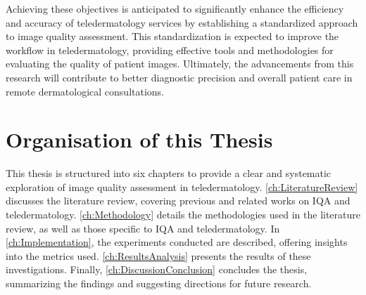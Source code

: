Achieving these objectives is anticipated to significantly enhance the efficiency and accuracy of teledermatology services by establishing a standardized approach to image quality assessment. This standardization is expected to improve the workflow in teledermatology, providing effective tools and methodologies for evaluating the quality of patient images. Ultimately, the advancements from this research will contribute to better diagnostic precision and overall patient care in remote dermatological consultations. \par

\section{Organisation of this Thesis}
\label{sec:Structure}
This thesis is structured into six chapters to provide a clear and systematic exploration of image quality assessment in teledermatology. \autoref{ch:LiteratureReview} discusses the literature review, covering previous and related works on IQA and teledermatology. \autoref{ch:Methodology} details the methodologies used in the literature review, as well as those specific to IQA and teledermatology. In \autoref{ch:Implementation}, the experiments conducted are described, offering insights into the metrics used. \autoref{ch:ResultsAnalysis} presents the results of these investigations. Finally, \autoref{ch:DiscussionConclusion} concludes the thesis, summarizing the findings and suggesting directions for future research. \par